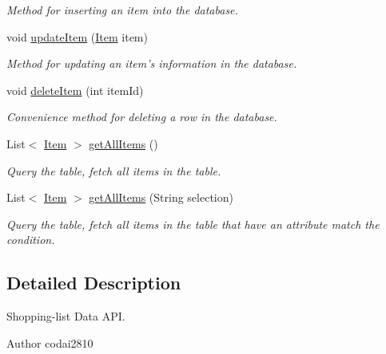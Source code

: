 \begin{DoxyCompactItemize}
\begin{DoxyCompactList}\small\item\em Method for inserting an item into the database. \end{DoxyCompactList}\item 
void \hyperlink{classvip2012_1_1g07_1_1shoppinglist_1_1ItemsDataSource_a89e56353e7301c70c6a3fa7ae8c98776}{update\-Item} (\hyperlink{classvip2012_1_1g07_1_1shoppinglist_1_1Item}{Item} item)
\begin{DoxyCompactList}\small\item\em Method for updating an item's information in the database. \end{DoxyCompactList}\item 
void \hyperlink{classvip2012_1_1g07_1_1shoppinglist_1_1ItemsDataSource_a5db93191fa502994fe32c410cdfedbda}{delete\-Item} (int item\-Id)
\begin{DoxyCompactList}\small\item\em Convenience method for deleting a row in the database. \end{DoxyCompactList}\item 
List$<$ \hyperlink{classvip2012_1_1g07_1_1shoppinglist_1_1Item}{Item} $>$ \hyperlink{classvip2012_1_1g07_1_1shoppinglist_1_1ItemsDataSource_a170631594944dfbe690b8354d04bac9f}{get\-All\-Items} ()
\begin{DoxyCompactList}\small\item\em Query the table, fetch all items in the table. \end{DoxyCompactList}\item 
List$<$ \hyperlink{classvip2012_1_1g07_1_1shoppinglist_1_1Item}{Item} $>$ \hyperlink{classvip2012_1_1g07_1_1shoppinglist_1_1ItemsDataSource_af2df438195f3a727e4e09c82071a9bb4}{get\-All\-Items} (String selection)
\begin{DoxyCompactList}\small\item\em Query the table, fetch all items in the table that have an attribute match the condition. \end{DoxyCompactList}\end{DoxyCompactItemize}


\subsection{Detailed Description}
Shopping-\/list Data A\-P\-I. 

\begin{DoxyAuthor}{Author}
codai2810 
\end{DoxyAuthor}


